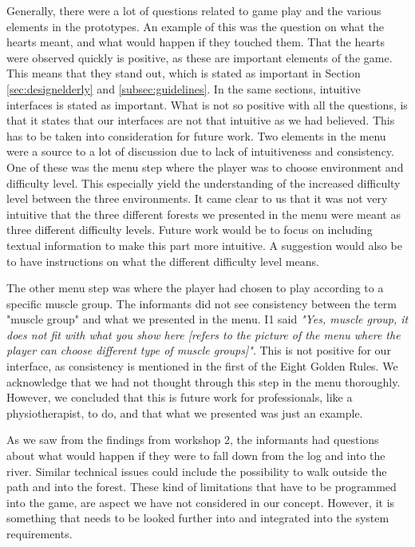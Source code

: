 Generally, there were a lot of questions related to game play and the various elements in the prototypes. An example of this was the question on what the hearts meant, and what would happen if they touched them. That the hearts were observed quickly is positive, as these are important elements of the game. This means that they stand out, which is stated as important in Section \ref{sec:designelderly} and \ref{subsec:guidelines}. In the same sections, intuitive interfaces is stated as important. What is not so positive with all the questions, is that it states that our interfaces are not that intuitive as we had believed. This has to be taken into consideration for future work. Two elements in the menu were a source to a lot of discussion due to lack of intuitiveness and consistency. One of these was the menu step where the player was to choose environment and difficulty level. This especially yield the understanding of the increased difficulty level between the three environments. It came clear to us that it was not very intuitive that the three different forests we presented in the menu were meant as three different difficulty levels. Future work would be to focus on including textual information to make this part more intuitive. A suggestion would also be to have instructions on what the different difficulty level means.

The other menu step was where the player had chosen to play according to a specific muscle group. The informants did not see consistency between the term "muscle group" and what we presented in the menu. I1 said \emph{"Yes, muscle group, it does not fit with what you show here [refers to the picture of the menu where the player can choose different type of muscle groups]"}. This is not positive for our interface, as consistency is mentioned in the first of the Eight Golden Rules. We acknowledge that we had not thought through this step in the menu thoroughly. However, we concluded that this is future work for professionals, like a physiotherapist, to do, and that what we presented was just an example. 

As we saw from the findings from workshop 2, the informants had questions about what would happen if they were to fall down from the log and into the river. Similar technical issues could include the possibility to walk outside the path and into the forest. These kind of limitations that have to be programmed into the game, are aspect we have not considered in our concept. However, it is something that needs to be looked further into and integrated into the system requirements.   

